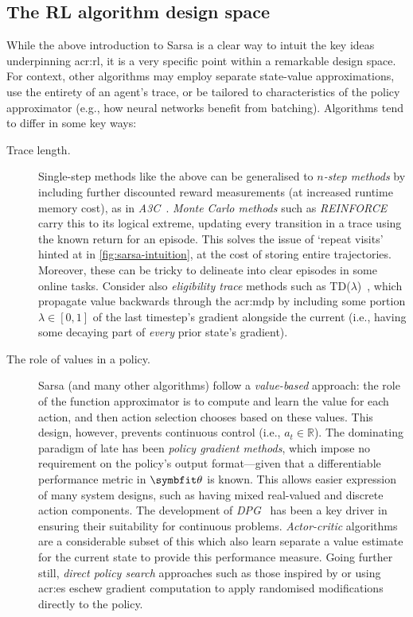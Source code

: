 \subsection{The RL algorithm design space}
While the above introduction to Sarsa is a clear way to intuit the key ideas underpinning \gls{acr:rl}, it is a very specific point within a remarkable design space.
For context, other algorithms may employ separate state-value approximations, use the entirety of an agent's trace, or be tailored to characteristics of the policy approximator (e.g., how neural networks benefit from batching).
Algorithms tend to differ in some key ways:

\begin{description}
	\item[Trace length.] Single-step methods like the above can be generalised to \emph{$n$-step methods} by including further discounted reward measurements (at increased runtime memory cost), as in \emph{A3C}~\parencite{DBLP:conf/icml/MnihBMGLHSK16}. \emph{Monte Carlo methods} such as \emph{REINFORCE}~\parencite{DBLP:journals/ml/Williams92} carry this to its logical extreme, updating every transition in a trace using the known return for an episode. This solves the issue of `repeat visits' hinted at in \cref{fig:sarsa-intuition}, at the cost of storing entire trajectories. Moreover, these can be tricky to delineate into clear episodes in some online tasks. Consider also \emph{eligibility trace} methods such as TD($\lambda$)~\parencite{DBLP:journals/cacm/Tesauro95}, which propagate value backwards through the \gls{acr:mdp} by including some portion $\lambda\in\left[0,1\right]$ of the last timestep's gradient alongside the current (i.e., having some decaying part of \emph{every} prior state's gradient).
	\item[The role of values in a policy.] Sarsa (and many other algorithms) follow a \emph{value-based} approach: the role of the function approximator is to compute and learn the value for each action, and then action selection chooses based on these values. This design, however, prevents continuous control (i.e., $a_t\in\mathbb{R}$). The dominating paradigm of late has been \emph{policy gradient methods}, which impose no requirement on the policy's output format---given that a differentiable performance metric in $\wvec{}$ is known. This allows easier expression of many system designs, such as having mixed real-valued and discrete action components. The development of \emph{DPG}~\parencite{DBLP:conf/icml/SilverLHDWR14} has been a key driver in ensuring their suitability for continuous problems. \emph{Actor-critic} algorithms are a considerable subset of this which also learn separate a value estimate for the current state to provide this performance measure. Going further still, \emph{direct policy search} approaches such as those inspired by or using \gls{acr:es} eschew gradient computation to apply randomised modifications directly to the policy.
\end{description}

